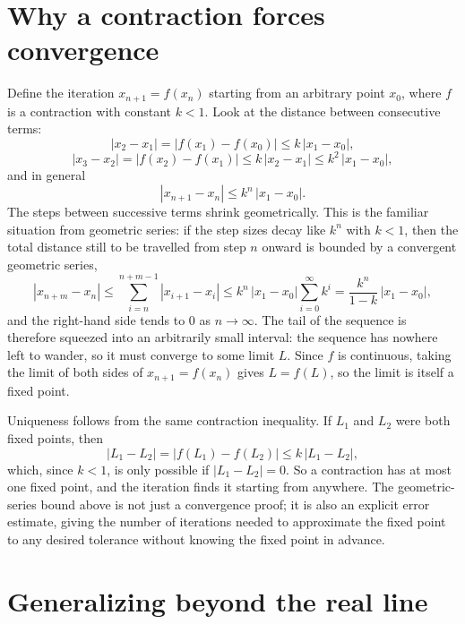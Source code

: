 \documentclass{essay}
\begin{document}
\section{Why a contraction forces convergence}

Define the iteration \(x_{n+1} = f(x_{n})\) starting from an arbitrary
point \(x_{0}\), where \(f\) is a contraction with constant \(k < 1\). Look
at the distance between consecutive terms:
\[ |x_{2} - x_{1}| = |f(x_{1}) - f(x_{0})| \le k\,|x_{1} - x_{0}|, \]
\[ |x_{3} - x_{2}| = |f(x_{2}) - f(x_{1})| \le k\,|x_{2} - x_{1}| \le k^{2}\,|x_{1} - x_{0}|, \]
and in general
\[ |x_{n+1} - x_{n}| \le k^{n}\,|x_{1} - x_{0}|. \]
The steps between successive terms shrink geometrically. This is the
familiar situation from geometric series: if the step sizes decay
like \(k^{n}\) with \(k < 1\), then the total distance still to be
travelled from step \(n\) onward is bounded by a convergent geometric
series,
\[ |x_{n+m} - x_{n}| \le \sum_{i=n}^{n+m-1} |x_{i+1} - x_{i}| \le k^{n}\,|x_{1} - x_{0}| \sum_{i=0}^{\infty} k^{i} = \frac{k^{n}}{1-k}\,|x_{1} - x_{0}|, \]
and the right-hand side tends to \(0\) as \(n \to \infty\). The tail of
the sequence is therefore squeezed into an arbitrarily small
interval: the sequence has nowhere left to wander, so it must
converge to some limit \(L\). Since \(f\) is continuous, taking the limit
of both sides of \(x_{n+1} = f(x_{n})\) gives \(L = f(L)\), so the limit is
itself a fixed point.

Uniqueness follows from the same contraction inequality. If \(L_{1}\) and
\(L_{2}\) were both fixed points, then
\[ |L_{1} - L_{2}| = |f(L_{1}) - f(L_{2})| \le k\,|L_{1} - L_{2}|, \]
which, since \(k < 1\), is only possible if \(|L_{1} - L_{2}| = 0\). So a
contraction has at most one fixed point, and the iteration finds it
starting from anywhere. The geometric-series bound above is not just
a convergence proof; it is also an explicit error estimate, giving
the number of iterations needed to approximate the fixed point to any
desired tolerance without knowing the fixed point in advance.

\section{Generalizing beyond the real line}
\end{document}

